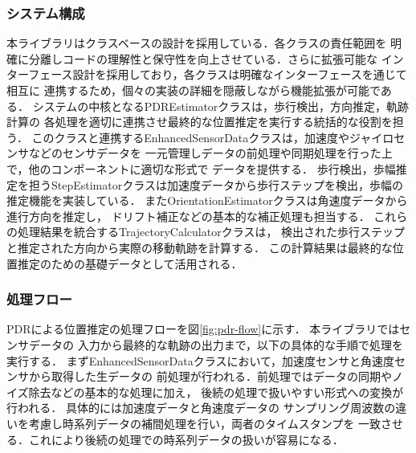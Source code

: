 \subsubsection{システム構成}

本ライブラリはクラスベースの設計を採用している．各クラスの責任範囲を
明確に分離しコードの理解性と保守性を向上させている．さらに拡張可能な
インターフェース設計を採用しており，各クラスは明確なインターフェースを通じて相互に
連携するため，個々の実装の詳細を隠蔽しながら機能拡張が可能である．
システムの中核となるPDREstimatorクラスは，歩行検出，方向推定，軌跡計算の
各処理を適切に連携させ最終的な位置推定を実行する統括的な役割を担う．
このクラスと連携するEnhancedSensorDataクラスは，加速度やジャイロセンサなどのセンサデータを
一元管理しデータの前処理や同期処理を行った上で，他のコンポーネントに適切な形式で
データを提供する．
歩行検出，歩幅推定を担うStepEstimatorクラスは加速度データから歩行ステップを検出，歩幅の推定機能を実装している．
またOrientationEstimatorクラスは角速度データから進行方向を推定し，
ドリフト補正などの基本的な補正処理も担当する．
これらの処理結果を統合するTrajectoryCalculatorクラスは，
検出された歩行ステップと推定された方向から実際の移動軌跡を計算する．
この計算結果は最終的な位置推定のための基礎データとして活用される．

\subsubsection{処理フロー}
PDRによる位置推定の処理フローを図\ref{fig:pdr-flow}に示す．
本ライブラリではセンサデータの
入力から最終的な軌跡の出力まで，以下の具体的な手順で処理を実行する．
まずEnhancedSensorDataクラスにおいて，加速度センサと角速度センサから取得した生データの
前処理が行われる．前処理ではデータの同期やノイズ除去などの基本的な処理に加え，
後続の処理で扱いやすい形式への変換が行われる．
具体的には加速度データと角速度データの
サンプリング周波数の違いを考慮し時系列データの補間処理を行い，両者のタイムスタンプを
一致させる．これにより後続の処理での時系列データの扱いが容易になる．

